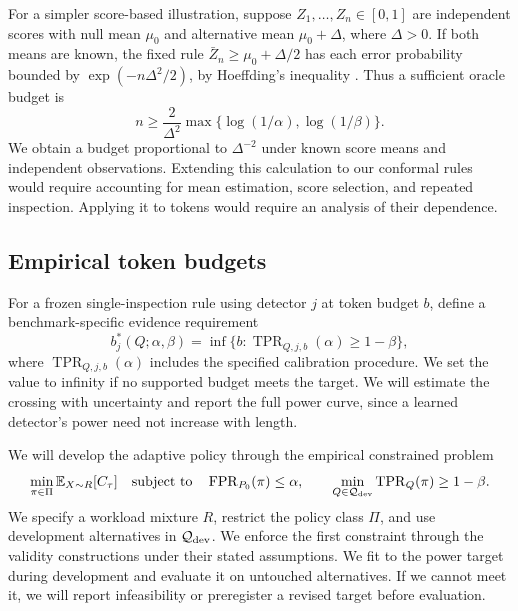 \documentclass[pdflatex,sn-mathphys-num]{sn-jnl}
\newcommand{\Expect}{\mathbb{E}}
\newcommand{\FPR}{\operatorname{FPR}}
\newcommand{\TPR}{\operatorname{TPR}}
\begin{document}
For a simpler score-based illustration, suppose \(Z_1,\ldots,Z_n\in[0,1]\) are independent scores with null mean \(\mu_0\) and alternative mean \(\mu_0+\Delta\), where \(\Delta>0\). If both means are known, the fixed rule \(\bar Z_n\geq\mu_0+\Delta/2\) has each error probability bounded by \(\exp(-n\Delta^2/2)\), by Hoeffding's inequality \citep{hoeffding1963}. Thus a sufficient oracle budget is
\begin{equation}
 n\geq \frac{2}{\Delta^2}
 \max\{\log(1/\alpha),\log(1/\beta)\}.
 \label{eq:oraclebudget}
\end{equation}
We obtain a budget proportional to \(\Delta^{-2}\) under known score means and independent observations. Extending this calculation to our conformal rules would require accounting for mean estimation, score selection, and repeated inspection. Applying it to tokens would require an analysis of their dependence.

\subsection{Empirical token budgets}

For a frozen single-inspection rule using detector \(j\) at token budget \(b\), define a benchmark-specific evidence requirement
\begin{equation}
 b_j^*(Q;\alpha,\beta)
 =\inf\{b:\TPR_{Q,j,b}(\alpha)\geq 1-\beta\},
 \label{eq:empbudget}
\end{equation}
where \(\TPR_{Q,j,b}(\alpha)\) includes the specified calibration procedure. We set the value to infinity if no supported budget meets the target. We will estimate the crossing with uncertainty and report the full power curve, since a learned detector's power need not increase with length.

We will develop the adaptive policy through the empirical constrained problem
\begin{equation}
 \min_{\pi\in\Pi}\Expect_{X\sim R}[C_\tau]
 \quad\text{subject to}\quad
 \FPR_{P_0}(\pi)\leq\alpha,\qquad
 \min_{Q\in\mathcal Q_{\rm dev}}\TPR_Q(\pi)\geq1-\beta.
 \label{eq:objective}
\end{equation}
We specify a workload mixture \(R\), restrict the policy class \(\Pi\), and use development alternatives in \(\mathcal Q_{\rm dev}\). We enforce the first constraint through the validity constructions under their stated assumptions. We fit to the power target during development and evaluate it on untouched alternatives. If we cannot meet it, we will report infeasibility or preregister a revised target before evaluation.
\end{document}
